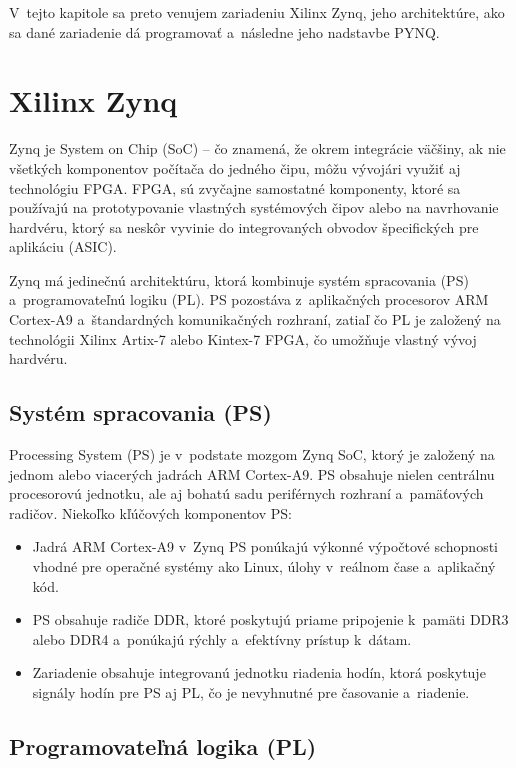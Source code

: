 V~tejto kapitole sa preto venujem zariadeniu Xilinx Zynq, jeho architektúre, ako sa dané zariadenie dá programovať a~následne jeho nadstavbe PYNQ. 

\section{Xilinx Zynq}
Zynq je System on Chip (SoC) – čo znamená, že okrem integrácie väčšiny, ak nie všetkých komponentov počítača do jedného čipu, môžu vývojári využiť aj technológiu FPGA. FPGA, sú zvyčajne samostatné komponenty, ktoré sa používajú na prototypovanie vlastných systémových čipov alebo na navrhovanie hardvéru, ktorý sa neskôr vyvinie do integrovaných obvodov špecifických pre aplikáciu (ASIC).~\cite{whatZynq}

Zynq má jedinečnú architektúru, ktorá kombinuje systém spracovania (PS) a~programovateľnú logiku (PL). PS pozostáva z~aplikačných procesorov ARM Cortex-A9 a~štandardných komunikačných rozhraní, zatiaľ čo PL je založený na technológii Xilinx Artix-7 alebo Kintex-7 FPGA, čo umožňuje vlastný vývoj hardvéru.~\cite{zynqDoc}

\subsection{Systém spracovania (PS)}

Processing System (PS) je v~podstate mozgom Zynq SoC, ktorý je založený na jednom alebo viacerých jadrách ARM Cortex-A9. PS obsahuje nielen centrálnu procesorovú jednotku, ale aj bohatú sadu periférnych rozhraní a~pamäťových radičov. Niekoľko kľúčových komponentov PS:

\begin{itemize}
    \item Jadrá ARM Cortex-A9 v~Zynq PS ponúkajú výkonné výpočtové schopnosti vhodné pre operačné systémy ako Linux, úlohy v~reálnom čase a~aplikačný kód.
    \item PS obsahuje radiče DDR, ktoré poskytujú priame pripojenie k~pamäti DDR3 alebo DDR4 a~ponúkajú rýchly a~efektívny prístup k~dátam.
    \item Zariadenie obsahuje integrovanú jednotku riadenia hodín, ktorá poskytuje signály hodín pre PS aj PL, čo je nevyhnutné pre časovanie a~riadenie.~\cite{zynqDoc}
\end{itemize}


\subsection{Programovateľná logika (PL)}

